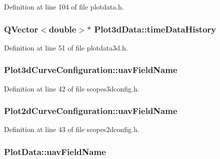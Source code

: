\-Definition at line 104 of file plotdata.\-h.

\hypertarget{group___scope_plugin_ga92914eba20188371aeb3ad365c01acc4}{
\subsubsection[{time\-Data\-History}]{\setlength{\rightskip}{0pt plus 5cm}\-Q\-Vector$<$double$>$$\ast$ {\bf \-Plot3d\-Data\-::time\-Data\-History}}}\label{group___scope_plugin_ga92914eba20188371aeb3ad365c01acc4}


\-Definition at line 51 of file plotdata3d.\-h.

\hypertarget{group___scope_plugin_ga16c893aa5d7da613ba51f6bd7bf70fc8}{
\subsubsection[{uav\-Field\-Name}]{ {\bf \-Plot3d\-Curve\-Configuration\-::uav\-Field\-Name}}}\label{group___scope_plugin_ga16c893aa5d7da613ba51f6bd7bf70fc8}


\-Definition at line 42 of file scopes3dconfig.\-h.

\hypertarget{group___scope_plugin_ga5f9e57253d839d8b0094e4360f61155f}{
\subsubsection[{uav\-Field\-Name}]{ {\bf \-Plot2d\-Curve\-Configuration\-::uav\-Field\-Name}}}\label{group___scope_plugin_ga5f9e57253d839d8b0094e4360f61155f}


\-Definition at line 43 of file scopes2dconfig.\-h.

\hypertarget{group___scope_plugin_ga3b137cdb062886f986237f8c9b527c22}{
\subsubsection[{uav\-Field\-Name}]{ {\bf \-Plot\-Data\-::uav\-Field\-Name}}}\label{group___scope_plugin_ga3b137cdb062886f986237f8c9b527c22}


